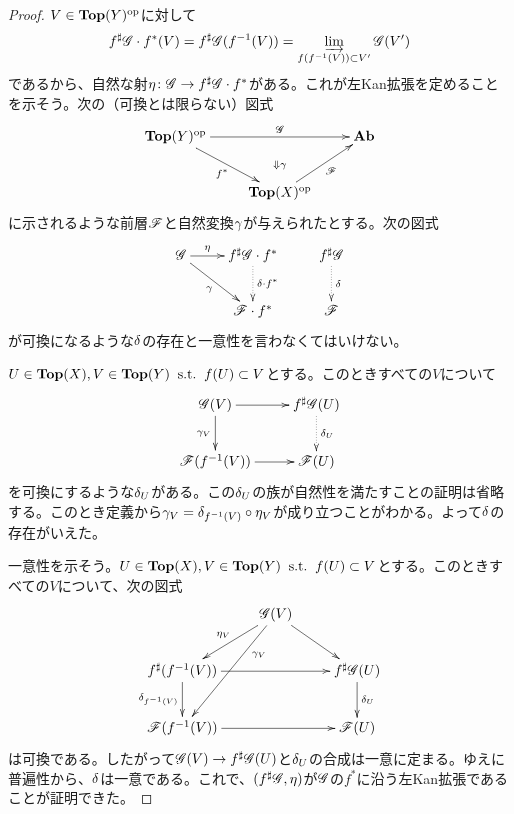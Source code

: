   \begin{proof}
    $V \in \textbf{Top}(Y)^{\text{op}}$に対して
    \[
    f^{\sharp}\mathscr{G} \cdot f^*(V) =  f^{\sharp}\mathscr{G} (f^{-1}(V)) = \operatorname*{\varinjlim}_{f(f^{-1}(V)) \subset V'} \mathscr{G}(V')
    \]
    であるから、自然な射$\eta \colon \mathscr{G} \to f^{\sharp}\mathscr{G} \cdot f^*$がある。これが左Kan拡張を定めることを示そう。次の（可換とは限らない）図式
\[
\xymatrix{
\Top(Y)\op \ar[dr]_-{f^*} \ar[rr]^-{\scrg} & {} \ar@{}[d]|{\Downarrow \grg}  & \Ab \\
{} & \Top(X)\op \ar[ru]_-{\scrf} & {}
}
\]
に示されるような前層$\mathscr{F}$と自然変換${\gamma}$が与えられたとする。次の図式
\[
\xymatrix{
\scrg \ar[rd]_-{\grg} \ar[r]^-{\eta} & f\sh \scrg \cdot f^* \ar@{.>}[d]^-{\grd \cdot f^*} & f\sh \scrg \ar@{.>}[d]^-{\grd} \\
{} & \scrf \cdot f^* & \scrf
}
\]
が可換になるような${\delta}$の存在と一意性を言わなくてはいけない。

$U \in \textbf{Top}(X),V \in \textbf{Top}(Y)  \; \; \text{s.t.} \; \; f(U) \subset V$とする。このときすべての$V$について
\[
\xymatrix{
\scrg(V) \ar[d]_{\grg_V} \ar[r] & f\sh \scrg (U) \ar@{.>}[d]^-{\grd_U} \\
\scrf(f^{-1}(V)) \ar[r] & \scrf(U)
}
\]
を可換にするような${\delta}_U$がある。この${\delta}_U$の族が自然性を満たすことの証明は省略する。このとき定義から${\gamma}_V = {\delta}_{f^{-1}(V)} \circ \eta_V$が成り立つことがわかる。よって${\delta}$の存在がいえた。

一意性を示そう。$U \in \textbf{Top}(X),V \in \textbf{Top}(Y)  \; \; \text{s.t.} \; \; f(U) \subset V$とする。このときすべての$V$について、次の図式
\[
\xymatrix{
{} & \scrg(V) \ar[dl]_-{\eta_V} \ar[dr] \ar[ddl]^(.3){\grg_V} & {} \\
f\sh (f^{-1}(V) ) \ar[rr] \ar[d]_-{\grd_{ f^{-1}(V) }} & {} & f\sh \scrg(U) \ar[d]^-{\grd_U} \\
\scrf( f^{-1}(V) )  \ar[rr] & {} & \scrf(U)
}
\]
は可換である。したがって$\mathscr{G}(V) \to f^{\sharp} \mathscr{G}(U)$と${\delta}_U$の合成は一意に定まる。ゆえに普遍性から、${\delta}$は一意である。これで、$(f^{\sharp} \mathscr{G}, \eta)$が$\mathscr{G}$の$f^*$に沿う左Kan拡張であることが証明できた。
  \end{proof}

